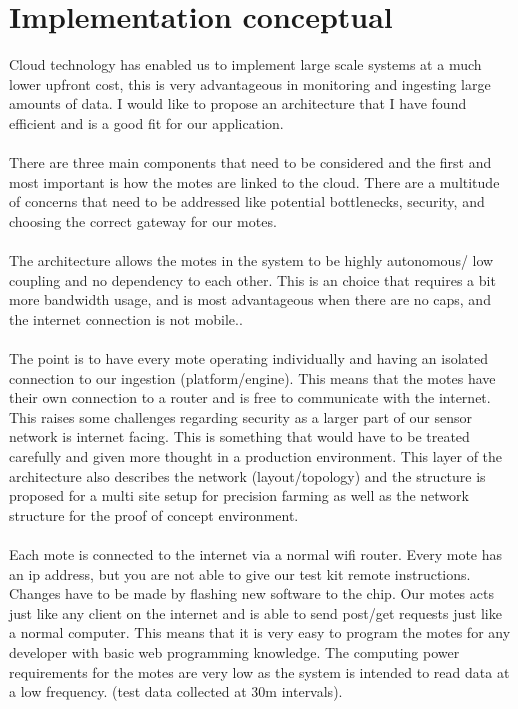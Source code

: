 \documentclass[]{uiophd}
\begin{document}
\section{Implementation conceptual}
Cloud technology has enabled us to implement large scale systems at a much lower upfront cost, this is very advantageous in monitoring and ingesting large amounts of data. I would like to propose an architecture that I have found efficient and is a good fit for our application. 
\\\\
There are three main components that need to be considered and the first and most important is how the motes are linked to the cloud. There are a multitude of concerns that need to be addressed like potential bottlenecks, security, and choosing the correct gateway for our motes.
\\\\
The architecture allows the motes in the system to be highly autonomous/ low coupling and no dependency to each other. This is an choice that requires a bit more bandwidth usage, and is most advantageous when there are no caps, and the internet connection is not mobile..
\\\\
The point is to have every mote operating individually and having an isolated connection to our ingestion (platform/engine). This means that the motes have their own connection to a router and is free to communicate with the internet. This raises some challenges regarding security as a larger part of our sensor network is internet facing. This is something that would have to be treated carefully and given more thought in a production environment. This layer of the architecture also describes the network (layout/topology) and the structure is proposed for a multi site setup for precision farming as well as the network structure for the proof of concept environment.
\\\\
Each mote is connected to the internet via a normal wifi router. Every mote has an ip address, but you are not able to give our test kit remote instructions. Changes have to be made by flashing new software to the chip. Our motes acts just like any client on the internet and is able to send post/get requests just like a normal computer. This means that it is very easy to program the motes for any developer with basic web programming knowledge. The computing power requirements for the motes are very low as the system is intended to read data at a low frequency. (test data collected at 30m intervals).
\end{document}
